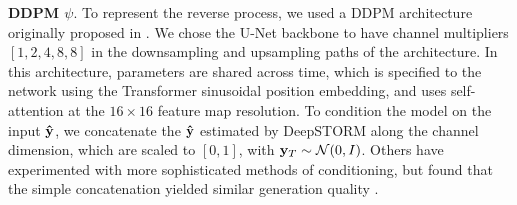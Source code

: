 \documentclass{article}
\begin{document}
\textbf{DDPM $\psi$}. To represent the reverse process, we used a DDPM architecture originally proposed in \citep{Saharia2021}. We chose the U-Net backbone to have channel multipliers $[1,2,4,8,8]$ in the downsampling and upsampling paths of the architecture. In this architecture, parameters are shared across time, which is specified to the network using the Transformer sinusoidal position embedding, and uses self-attention at the $16 \times 16$ feature map resolution. To condition the model on the input $\bold{\hat{y}}$, we concatenate the $\bold{\hat{y}}$ estimated by DeepSTORM along the channel dimension, which are scaled to $[0,1]$, with $\bold{y}_T\sim \mathcal{N}(0, I)$. Others have experimented with more sophisticated methods of conditioning, but found that the simple concatenation yielded similar generation quality \citep{Saharia2021}. 
\end{document}
